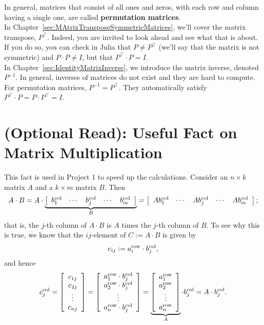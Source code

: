 \begin{tcolorbox}[title=\textbf{Permutation Matrices, the Full Story}]
In general, matrices that consist of all ones and zeros, with each row and column having a single one, are called \textbf{permutation matrices}. \\

In Chapter~\ref{sec:MAtrixTransposeSymmetricMatrices}, we'll cover the matrix transpose, $P^\top$.  Indeed, you are invited to look ahead and see what that is about. If you do so, you can check in Julia that 
$P \neq P^\top$ (we'll say that the matrix is not symmetric) and $P \cdot P \neq I$, but that $ P^\top \cdot P=I$.\\

In Chapter~\ref{sec:IdentityMatrixInverse}, we introduce the matrix inverse, denoted $P^{-1}$. In general, inverses of matrices do not exist and they are hard to compute. For permutation matrices,  $P^{-1} = P^\top$. They automatically satisfy $P^\top \cdot P = P \cdot P^\top =  I$.
\end{tcolorbox}


\section{(Optional Read):  Useful Fact on Matrix Multiplication}

This fact is used in Project 1 to speed up the calculations. Consider an $n \times k$ matrix $A$ and a $k \times m$ matrix $B$. Then
$$A \cdot B = A \cdot \underbrace{\left[ \begin{array}{ccccc}b^{\rm col}_1 & \cdots & b^{\rm col}_j & \cdots & b^{\rm col}_m
\end{array} \right]}_B =  \left[ \begin{array}{ccccc}A b^{\rm col}_1 & \cdots & A b^{\rm col}_j & \cdots & A b^{\rm col}_m
\end{array} \right];$$
that is, the $j$-th column of $A \cdot B$ is $A$ times the $j$-th column of $B$. To see why this is true, we know that the $ij$-element of $C:=A \cdot B$ is given by 
$$c_{ij} : = a^{\rm row}_i \cdot b^{\rm col}_j,$$
and hence
$$c^{\rm col}_j = \left[ \begin{array}{c} c_{1j} \\ c_{2j} \\ \vdots \\ c_{nj}
\end{array} \right] = \left[ \begin{array}{c} a^{\rm row}_1 \cdot b^{\rm col}_j \\ a^{\rm row}_2 \cdot b^{\rm col}_j \\ \vdots \\ a^{\rm row}_n \cdot b^{\rm col}_j
\end{array} \right] = \underbrace{\left[ \begin{array}{c} a^{\rm row}_1 \\ a^{\rm row}_2 \\ \vdots \\ a^{\rm row}_n
\end{array} \right]}_{A} \cdot b^{\rm col}_j= A \cdot b^{\rm col}_j.$$


